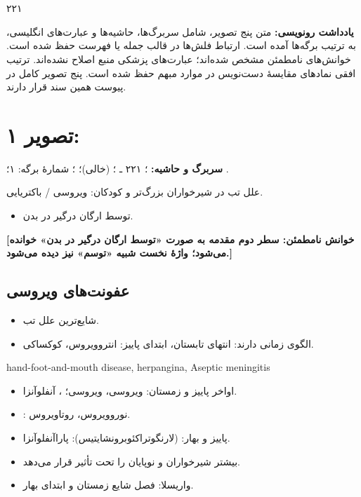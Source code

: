 \documentclass[12pt,a4paper]{article}
\begin{document}
\fi
\providecommand{\FeverOlderUnclear}[1]{\textbf{[خوانش نامطمئن: #1]}}
\providecommand{\FeverOlderMath}[1]{\lr{\(#1\)}}
\providecommand{\FeverOlderPage}[2]{\clearpage\section*{تصویر #1: \lr{\texttt{pic#2.jpg}}}}
\providecommand{\FeverOlderHeader}[1]{\textbf{سربرگ و حاشیه:} ۲۲۱ ـ؛
  \lr{Subject:} (خالی)؛ \lr{Date: / /}؛ شمارهٔ برگه: #1؛ نشان پایین برگه: \lr{YASHA}.\par}

\begin{center}
{\Large\bfseries {}}\\
\\
۲۲۱
\end{center}
\textbf{یادداشت رونویسی:} متن پنج تصویر، شامل سربرگ‌ها، حاشیه‌ها و عبارت‌های انگلیسی، به ترتیب برگه‌ها آمده است. ارتباط فلش‌ها در قالب جمله یا فهرست حفظ شده است. خوانش‌های نامطمئن مشخص شده‌اند؛ عبارت‌های پزشکی منبع اصلاح نشده‌اند. ترتیب افقی نمادهای مقایسهٔ دست‌نویس در موارد مبهم حفظ شده است. پنج تصویر کامل در پیوست همین سند قرار دارند.

\FeverOlderPage{۱}{01}
\textbf{سربرگ و حاشیه:} ؛ ۲۲۱ ـ ؛
 (خالی)؛ ؛ شمارهٔ برگه: ۱؛ .

علل تب در شیرخواران بزرگ‌تر و کودکان: ویروسی / باکتریایی.
\begin{itemize}
\item توسط ارگان درگیر در بدن.
\end{itemize}
\FeverOlderUnclear{سطر دوم مقدمه به صورت «توسط ارگان درگیر در بدن» خوانده می‌شود؛ واژهٔ نخست شبیه «توسم» نیز دیده می‌شود.}

\subsection*{عفونت‌های ویروسی}
\begin{itemize}
\item شایع‌ترین علل تب.
\item الگوی زمانی دارند: انتهای تابستان، ابتدای پاییز: انتروویروس، کوکساکی.
\end{itemize}
\begin{latin}
hand-foot-and-mouth disease, herpangina, Aseptic meningitis
\end{latin}
\begin{itemize}
\item اواخر پاییز و زمستان:  ویروسی،  ویروسی؛ ، آنفلوآنزا.
\item {}: نوروویروس، روتاویروس.
\item پاییز و بهار:  (لارنگوتراکئوبرونشایتیس): پاراآنفلوآنزا.
\item بیشتر شیرخواران و نوپایان را تحت تأثیر قرار می‌دهد.
\item واریسلا: فصل شایع زمستان و ابتدای بهار.
\end{itemize}
\end{document}
